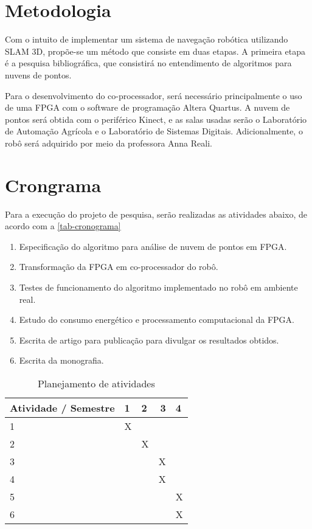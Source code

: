 	\chapter{Metodologia}\label{cap-metodologia}

	Com o intuito de implementar um sistema de navegação robótica utilizando SLAM 3D, propõe-se um método que consiste em duas etapas. A primeira etapa é a pesquisa bibliográfica, que consistirá no entendimento de algoritmos para nuvens de pontos.
	
	Para o desenvolvimento do co-processador, será necessário principalmente o uso de uma FPGA com o software de programação Altera Quartus. A nuvem de pontos será obtida com o periférico Kinect, e as salas usadas serão o Laboratório de Automação Agrícola e o Laboratório de Sistemas Digitais. Adicionalmente, o robô será adquirido por meio da professora Anna Reali.
	
	\chapter{Crongrama}\label{cap-cronograma}
	
	Para a execução do projeto de pesquisa, serão realizadas as atividades abaixo, de acordo com a \autoref{tab-cronograma}

	\begin{enumerate}
		\item Especificação do algoritmo para análise de nuvem de pontos em FPGA.
		\item Transformação da FPGA em co-processador do robô.
		\item Testes de funcionamento do algoritmo implementado no robô em ambiente real.
		\item Estudo do consumo energético e processamento computacional da FPGA.
		\item Escrita de artigo para publicação para divulgar os resultados obtidos.
		\item Escrita da monografia.
	\end{enumerate}

	\begin{table}[h]
		\centering
		\caption{Planejamento de atividades}
		\label{tab-cronograma}
		\begin{tabular}{lllrl}
			\multicolumn{1}{c}{Atividade / Semestre} & 1 & 2 & 3 & 4 \\ \hline
			1                                        & X &   &   &   \\
			2                                        &   & X &   &   \\
			3                                        &   &   & X &   \\
			4                                        &   &   & X &   \\
			5                                        &   &   &   & X \\
			6                                        &   &   &   & X
		\end{tabular}
	\end{table}